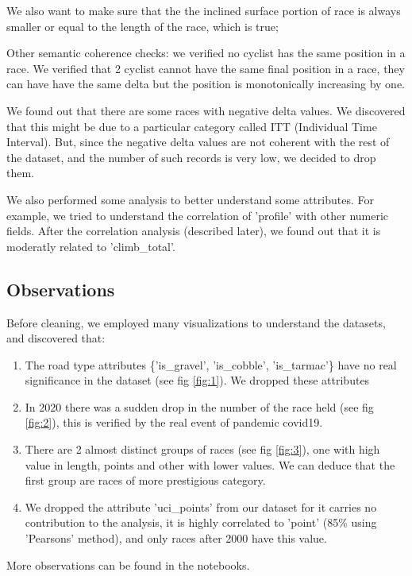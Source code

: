 \documentclass{article}
\begin{document}
We also want to make sure that the the inclined surface portion of race is always smaller or equal to the length of the race, which is true;

Other semantic coherence checks: we verified no cyclist has the same position in a race. We verified that 2 cyclist cannot have the same final position in a race, they can have have the same delta but the position is monotonically increasing by one. 

We found out that there are some races with negative delta values. We discovered that this might be due to a particular category called ITT (Individual Time Interval). But, since the negative delta values are not coherent with the rest of the dataset, and the number of such records is very low, we decided to drop them.

We also performed some analysis to better understand some attributes. For example, we tried to understand the correlation of 'profile' with other numeric fields. After the correlation analysis (described later), we found out that it is moderatly related to 'climb\_total'.


\subsection{Observations}
Before cleaning, we employed many visualizations to understand the datasets, and discovered that:

\begin{enumerate}
\item The road type attributes \{'is\_gravel', 'is\_cobble', 'is\_tarmac'\} have no real significance in the dataset (see fig \ref{fig:1}). We dropped these attributes
\item In 2020 there was a sudden drop in the number of the race held (see fig \ref{fig:2}), this is verified by the real event of pandemic covid19.
\item There are 2 almost distinct groups of races (see fig \ref{fig:3}), one with high value in length, points and other with lower values. We can deduce that the first group are races of more prestigious category. 
\item We dropped the attribute 'uci\_points' from our dataset for it carries no contribution to the analysis, it is highly correlated to 'point' (85\% using 'Pearsons' method), and only races after 2000 have this value.
\end{enumerate}

More observations can be found in the notebooks.
\end{document}
